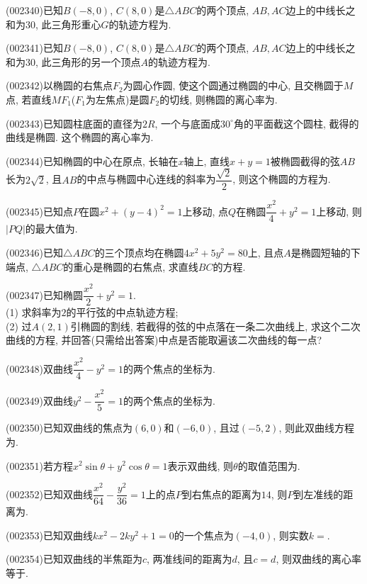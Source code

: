 \item (002340)已知$B(-8,0)$, $C(8,0)$是\underline{$\triangle ABC$}的两个顶点, $AB, AC$边上的中线长之和为$30$, 此三角形重心$G$的轨迹方程为.
\item (002341)已知$B(-8,0)$, $C(8,0)$是\underline{$\triangle ABC$}的两个顶点, $AB, AC$边上的中线长之和为$30$, 此三角形的另一个顶点$A$的轨迹方程为.
\item (002342)以椭圆的右焦点$F_2$为圆心作圆, 使这个圆通过椭圆的中心, 且交椭圆于$M$点, 若直线$MF_1$($F_1$为左焦点)是圆$F_2$的切线, 则椭圆的离心率为.
\item (002343)已知圆柱底面的直径为$2R$, 一个与底面成$30^\circ$角的平面截这个圆柱, 截得的曲线是椭圆.
这个椭圆的离心率为.
\item (002344)已知椭圆的中心在原点, 长轴在$x$轴上, 直线$x+y=1$被椭圆截得的弦$AB$长为$2\sqrt{2}$, 且$AB$的中点与椭圆中心连线的斜率为$\dfrac{\sqrt{2}}{2}$, 则这个椭圆的方程为.
\item (002345)已知点$P$在圆$x^2+(y-4)^2=1$上移动, 点$Q$在椭圆$\dfrac{x^2}{4}+y^2=1$上移动, 则$|PQ|$的最大值为.
\item (002346)已知$\triangle ABC$的三个顶点均在椭圆$4x^2+5y^2=80$上, 且点$A$是椭圆短轴的下端点, $\triangle ABC$的重心是椭圆的右焦点, 求直线$BC$的方程.
\item (002347)已知椭圆$\dfrac{x^2}{2}+y^2=1$.\\ 
(1) 求斜率为$2$的平行弦的中点轨迹方程;\\ 
(2) 过$A(2,1)$引椭圆的割线, 若截得的弦的中点落在一条二次曲线上, 求这个二次曲线的方程, 并回答(只需给出答案)中点是否能取遍该二次曲线的每一点?
\item (002348)双曲线$\dfrac{x^2}{4}-y^2=1$的两个焦点的坐标为.
\item (002349)双曲线$y^2-\dfrac{x^2}{5}=1$的两个焦点的坐标为.
\item (002350)已知双曲线的焦点为$(6,0)$和$(-6,0)$, 且过$(-5,2)$, 则此双曲线方程为.
\item (002351)若方程$x^2\sin\theta+y^2\cos\theta=1$表示双曲线, 则$\theta$的取值范围为.
\item (002352)已知双曲线$\dfrac{x^2}{64}-\dfrac{y^2}{36}=1$上的点$P$到右焦点的距离为$14$, 则$P$到左准线的距离为.
\item (002353)已知双曲线$kx^2-2ky^2+1=0$的一个焦点为$(-4,0)$, 则实数$k=$.
\item (002354)已知双曲线的半焦距为$c$, 两准线间的距离为$d$, 且$c=d$, 则双曲线的离心率等于.
